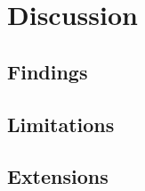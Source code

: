 \chapter{Discussion}\label{chapter:discussion}

\section{Findings}

\section{Limitations}

\section{Extensions}

